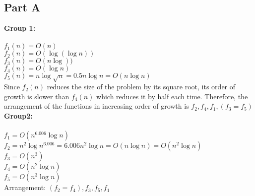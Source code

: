 \documentclass[12pt,twoside]{article}
\begin{document}

\begin{problems}

\section*{Part A}

\problem  %


\begin{problemparts}
\problempart \textbf{Group 1:} \\
\\
$ f_{1}(n) = O(n)$\\
$ f_{2}(n) = O(\log(\log n))$\\
$ f_{3}(n) = O(n\log ))$\\
$ f_{4}(n) = O(\log n)$\\
$ f_{5}(n) = n\log \sqrt{n} = 0.5n\log n = O(n\log n)$\\

Since $f_{2}(n)$ reduces the size of the problem by its square root, its order of growth is slower than $f_{4}(n)$  which reduces it by half each time. Therefore, the arrangement of the functions in increasing order of growth is $f_{2}, f_{4}, f_{1}, (f_{3} = f_{5})$ \\



\problempart \textbf{Group2:}\\
\\
$ f_{1} = O(n^{6.006}\log n) $ \\ 
$ f_{2} = n^{2}\log n^{6.006} = 6.006n^{2}\log n =O(n\log n) = O(n^{2}\log n) $\\
$ f_{3} = O(n^{3}) $\\
$ f_{4} = O(n^{2}\log n) $\\
$ f_{5} = O(n^{3}\log n) $\\ 


Arrangement: $ (f_{2} = f_{4}), f_{3}, f_{5}, f_{1}$\\




\end{problemparts}


\end{problems}
\end{document}
